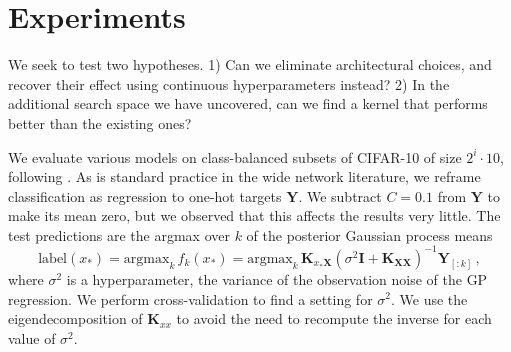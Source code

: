 \documentclass[tablecaption=bottom,wcp,nonatbib]{jmlr} %
\newcommand{\vX}{\mathbf{X}}
\newcommand{\vQ}{\mathbf{Q}}
\newcommand{\vK}{\mathbf{K}}
\newcommand{\vY}{\mathbf{Y}}
\newcommand{\vLambda}{\boldsymbol{\Lambda}}
\newcommand{\eye}{\mathbf{I}}
\newcommand{\tp}{{\mathrm{\textsf{\tiny T}}}}
\newcommand{\bracket}[3]{{\left#1 #3 \right#2}}
\newcommand{\bra}{\bracket{(}{)}}
\newcommand{\indicator}[1]{{\mathds{1}}\left[#1\right]}
\begin{document}
\section{Experiments}
We seek to test two hypotheses. 1) Can we eliminate architectural choices, and
recover their effect using continuous hyperparameters instead? 
2) In the additional search space we have uncovered, can we find a kernel that
performs better than the existing ones?

We evaluate various models on class-balanced subsets of CIFAR-10 of size $2^i \cdot 10$, following \citet{arora2020small}. As is
standard practice in the wide network literature, we reframe classification as
regression to one-hot targets $\vY$. %
We subtract $C=0.1$ from $\vY$ to make its mean zero, but we observed that this affects the results very little. The test
predictions are the argmax over $k$ of the posterior Gaussian process means
\begin{equation}\text{label}(x_*) = \text{argmax}_k \,f_k(x_*) = \text{argmax}_k \,\vK_{x_* \vX}\bra{\sigma^2\eye + \vK_{\vX\vX}}^{-1}\vY_{[:k]}\,, \label{eq:mean-gp}\end{equation} where
$\sigma^2$ is a hyperparameter, the variance of the observation noise of the GP regression. We perform cross-validation to find a setting for $\sigma^2$. We use the eigendecomposition of $\vK_{xx}$ to avoid the need to recompute the inverse for each value of $\sigma^2$.

\end{document}
